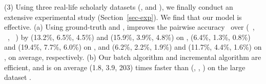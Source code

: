 \sstab(3) Using three real-life scholarly datasets (\aan, \aminer and \magdata), we finally conduct an extensive experimental study (Section~\ref{sec-exp}). We  find that our model \ensemblerank is effective.
%
(a) Using ground-truth \recom and \fcita, \ensemblerank improves the pairwise accuracy~\cite{Richardson06:BPR} over (\pagerank~\cite{Brin98:PageRank}, \futurerank~\cite{sayyadi09}, \hhgrank~\cite{Liang16AAAI}) by
(13.2\%, 6.5\%, 4.5\%) and (15.9\%, 3.9\%, 4.8\%) on \aan,
(6.4\%, 1.3\%, 0.8\%) and (19.4\%, 7.7\%, 6.0\%) on \aminer, and
(6.2\%, 2.2\%, 1.9\%) and (11.7\%, 4.4\%, 1.6\%) on \magdata, on average, respectively.
%
(b) Our batch algorithm \batensemble and incremental algorithm \incensemble are efficient, and  \incensemble is on average (1.8, 3.9, 203) times faster than (\batensemble, \futurerank, \hhgrank)  on the large dataset \magdata.








